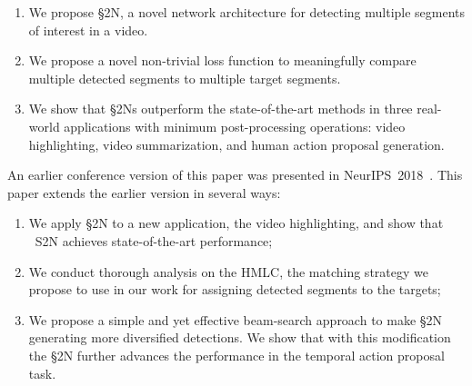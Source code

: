 \documentclass[10pt,journal,compsoc]{IEEEtran}
\begin{document}
\begin{enumerate}
	\item We propose \S2N, a novel network architecture for detecting multiple segments of interest in a video.
	\item We propose a novel non-trivial loss function to meaningfully compare  multiple detected segments to multiple target segments.
	\item We show that \S2Ns outperform the state-of-the-art methods in three real-world applications with minimum post-processing operations: video highlighting, video summarization, and human action proposal generation.
\end{enumerate}
An earlier conference version of this paper was presented in NeurIPS~2018~\cite{m_Wei-etal-NIPS18}. This paper extends the earlier version in several ways:


\begin{enumerate}
    \item We apply \S2N to a new application, the video highlighting, and show that \
S2N achieves state-of-the-art performance;
    \item We conduct thorough analysis on the HMLC, the matching strategy we propose to use in our work for assigning detected segments to the targets;
    \item We propose a simple and yet effective beam-search approach to make \S2N generating more diversified detections. We show that with this modification the \S2N further advances the performance in the temporal action proposal task.
\end{enumerate}
\end{document}
